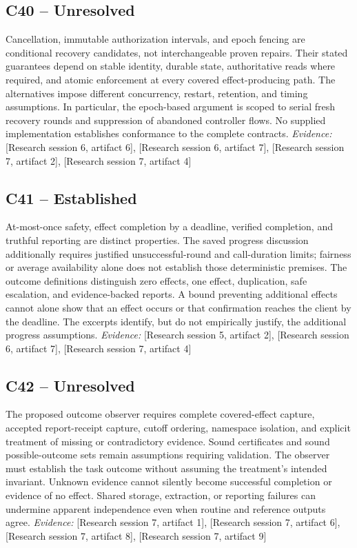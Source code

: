 \documentclass[11pt]{article}
\begin{document}
\subsection{C40 -- Unresolved}
Cancellation, immutable authorization intervals, and epoch fencing are conditional recovery candidates, not interchangeable proven repairs. Their stated guarantees depend on stable identity, durable state, authoritative reads where required, and atomic enforcement at every covered effect-producing path.
The alternatives impose different concurrency, restart, retention, and timing assumptions. In particular, the epoch-based argument is scoped to serial fresh recovery rounds and suppression of abandoned controller flows. No supplied implementation establishes conformance to the complete contracts.
\textit{Evidence: }[Research session 6, artifact 6], [Research session 6, artifact 7], [Research session 7, artifact 2], [Research session 7, artifact 4]
\subsection{C41 -- Established}
At-most-once safety, effect completion by a deadline, verified completion, and truthful reporting are distinct properties. The saved progress discussion additionally requires justified unsuccessful-round and call-duration limits; fairness or average availability alone does not establish those deterministic premises.
The outcome definitions distinguish zero effects, one effect, duplication, safe escalation, and evidence-backed reports. A bound preventing additional effects cannot alone show that an effect occurs or that confirmation reaches the client by the deadline. The excerpts identify, but do not empirically justify, the additional progress assumptions.
\textit{Evidence: }[Research session 5, artifact 2], [Research session 6, artifact 7], [Research session 7, artifact 4]
\subsection{C42 -- Unresolved}
The proposed outcome observer requires complete covered-effect capture, accepted report-receipt capture, cutoff ordering, namespace isolation, and explicit treatment of missing or contradictory evidence. Sound certificates and sound possible-outcome sets remain assumptions requiring validation.
The observer must establish the task outcome without assuming the treatment's intended invariant. Unknown evidence cannot silently become successful completion or evidence of no effect. Shared storage, extraction, or reporting failures can undermine apparent independence even when routine and reference outputs agree.
\textit{Evidence: }[Research session 7, artifact 1], [Research session 7, artifact 6], [Research session 7, artifact 8], [Research session 7, artifact 9]
\end{document}
